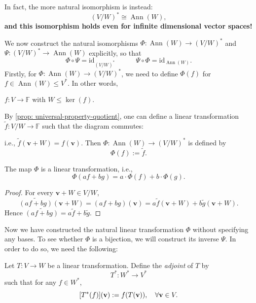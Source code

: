 In fact, the more natural isomorphism is instead:
  \[
  (V/W)^* \cong \operatorname{Ann}(W),
  \]
{\bf and this isomorphism holds even for infinite dimensional vector spaces!}

\medskip
We now construct the natural isomorphisms $\Phi: \operatorname{Ann}(W) \to (V/W)^*$ and 
$\Psi: (V/W)^* \to \operatorname{Ann}(W)$
explicitly, so that 
$$\Phi \circ \Psi = \mathrm{id}_{(V/W)^*} \quad \quad \quad \Psi \circ \Phi = \mathrm{id}_{\operatorname{Ann}(W)}.$$
Firstly, for $\Phi: \operatorname{Ann}(W) \to (V/W)^*$, we need to define $\Phi(f)$
for $f \in \operatorname{Ann}(W) \leq V^*$. In other words, 
\begin{center}
$f: V \to \mathbb{F}$ with $W \leq \ker(f)$. 
\end{center}
By \autoref{prop: universal-property-quotient}, one can define a linear transformation \(\widetilde{f} : V/W \to \mathbb{F}\) such that the diagram commutes:

\begin{figure}[h!]
\centering
{}
\end{figure}

i.e., \(\widetilde{f}(\mathbf{v} + W) = f(\mathbf{v})\). Then \(\Phi:\operatorname{Ann}(W) \to (V/W)^*\) is defined by
   \[\Phi(f) := \widetilde{f}.\]

\begin{proposition}
The map \( \Phi \) is a linear transformation, i.e.,
\[
\Phi(af + bg) = a \cdot \Phi(f) + b \cdot \Phi(g).
\]
\end{proposition}

\begin{proof}
For every \(\mathbf{v}+W\in V/W\),
\[
\widetilde{(af+bg)}(\mathbf{v}+W)
=(af+bg)(\mathbf{v})
=a\widetilde f(\mathbf{v}+W)+b\widetilde g(\mathbf{v}+W).
\]
Hence \(\widetilde{(af+bg)}=a\widetilde f+b\widetilde g\).
\end{proof}

Now we have constructed the natural linear transformation $\Phi$ without specifying any bases. To see whether \( \Phi \) is a bijection, we will construct its inverse \( \Psi \). In order to do so, we need the following:
\begin{definition}\label{def:adjoint-map}
Let \( T : V \to W \) be a linear transformation. Define the \emph{adjoint} of \( T \) by
\[
T^* : W^* \to V^*
\]
such that for any \( f \in W^* \),
\[
[T^*(f)]({\bf v}) := f(T({\bf v})), \quad \forall {\bf v} \in V.
\]
\end{definition}

